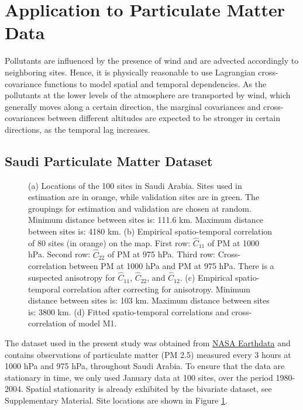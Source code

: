 \documentclass[12pt]{article}
\newcommand{\0}{\mathbf{0}}
\begin{document}
\section{Application to Particulate Matter Data}\label{sec:application}

Pollutants are influenced by the presence of wind and are advected accordingly to neighboring sites. Hence, it is physically reasonable to use Lagrangian cross-covariance functions to model spatial and temporal dependencies. As the pollutants at the lower levels of the atmosphere are transported by wind, which generally moves along a certain direction, the marginal covariances and cross-covariances between different altitudes are expected to be stronger in certain directions, as the temporal lag increases. 

\subsection{Saudi Particulate Matter Dataset}\label{sec:application_data}

\begin{figure}[htb!]
 \centering
\quad \quad{}%
  \; %
     \quad \quad \quad \quad   
    \caption{\small (a) Locations of the 100 sites in Saudi Arabia. Sites used in estimation are in orange, while validation sites are in green. The groupings for estimation and validation are chosen at random. Minimum distance between sites is: 111.6 km. Maximum distance between sites is: 4180 km. (b) Empirical spatio-temporal correlation of 80 sites (in orange) on the map. First row: $\hat{C}_{11}$ of PM at 1000 hPa. Second row: $\hat{C}_{22}$ of PM at 975 hPa. Third row: Cross-correlation between PM at 1000 hPa and PM at 975 hPa. There is a suspected anisotropy for $\hat{C}_{11}$, $\hat{C}_{22}$, and $\hat{C}_{12}$. (c) Empirical spatio-temporal correlation after correcting for anisotropy. Minimum distance between sites is: 103 km. Maximum distance between sites is: 3800 km. (d) Fitted spatio-temporal correlations and cross-correlation of model M1.}
    \label{fig:saudi_map}
\end{figure}

The dataset used in the present study was obtained from \href{https://goldsmr5.gesdisc.eosdis.nasa.gov/data/MERRA2/}{NASA Earthdata} and contains observations of particulate matter (PM 2.5) measured every 3 hours at 1000 hPa and 975 hPa, throughout Saudi Arabia. To ensure that the data are stationary in time, we only used January data at 100 sites, over the period 1980-2004. Spatial stationarity is already exhibited by the bivariate dataset, see Supplementary Material. Site locations are shown in Figure \ref{fig:saudi_map}. 
\end{document}
